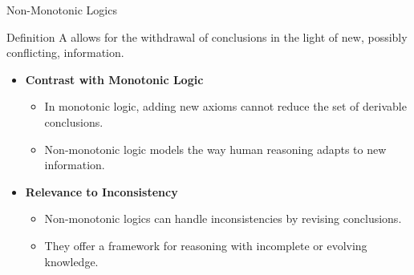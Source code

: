 \begin{frame}{Non-Monotonic Logics}
    \begin{block}{Definition}
        A  allows for the withdrawal of conclusions in the light of new, possibly conflicting, information.
    \end{block}
    \begin{itemize}
        \item \textbf{Contrast with Monotonic Logic}
              \begin{itemize}
                  \item In monotonic logic, adding new axioms cannot reduce the set of derivable conclusions.
                  \item Non-monotonic logic models the way human reasoning adapts to new information.
              \end{itemize}
        \item \textbf{Relevance to Inconsistency}
              \begin{itemize}
                  \item Non-monotonic logics can handle inconsistencies by revising conclusions.
                  \item They offer a framework for reasoning with incomplete or evolving knowledge.
              \end{itemize}
    \end{itemize}
\end{frame}

